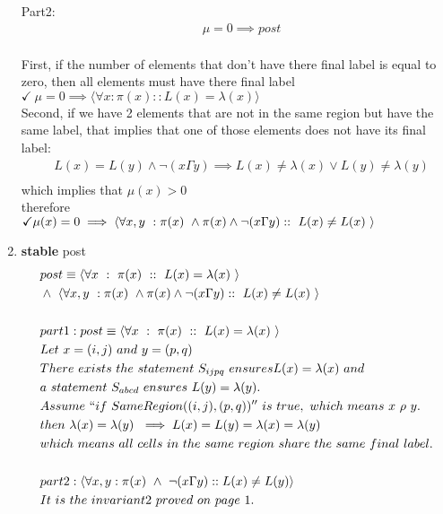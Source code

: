 \documentclass{article}
\begin{document}
\begin{enumerate}
Part2:\\
\begin{align*}
&\mu = 0 \implies post\\
\end{align*}

First, if the number of elements that don't have there final label is equal to zero, then all elements must have there final label\\
$\checkmark \ \mu = 0 \implies \langle \forall x : \pi(x) :: L(x)=\lambda(x) \rangle$\\

Second, if we have 2 elements that are not in the same region but have the same label, that implies that one of those elements does not have its final label:\\
\begin{align*}
&L(x) = L(y) \wedge \neg(x \Gamma y) \implies L(x)\neq\lambda(x) \vee L(y)\neq \lambda(y)\\
\end{align*}
which implies that
$\mu(x) > 0$\\
therefore\\
$\checkmark \mu(x)=0 \implies  \langle \forall x,y \ : \pi(x) \ \wedge \pi(x) \wedge \neg(x \Gamma y) :: \ L(x) \neq L(x)  \ \rangle\\$


\newpage
\item
\textbf{stable} post\\
\begin{align*}
&post \equiv \langle \forall x \ : \ \pi(x) \ :: \ L(x) = \lambda(x) \ \rangle\\
&\wedge \ \langle \forall x,y \ : \pi(x) \ \wedge \pi(x) \wedge \neg(x \Gamma y) :: \ L(x) \neq L(x)  \ \rangle\\
\\
&part 1:
post \equiv \langle \forall x \ : \ \pi(x) \ :: \ L(x) = \lambda(x) \ \rangle\\
&Let\ x = (i,j) \ and \ y = (p,q)\\
&There \ exists \ the \ statement\ S_{ijpq} \ ensures L(x)=\lambda(x) \ and\\ 
&a\ statement \ S_{abcd}\ ensures \ L(y)=\lambda(y).\\
&Assume\ ``if\ SameRegion((i,j),(p,q))'' \ is\ true,\ which\ means\ x\ \rho\ y.\\ 
&then \ \lambda(x)=\lambda(y)\ \implies L(x)=L(y)=\lambda(x)=\lambda(y)\\
&which\ means\ all\ cells\ in \ the\ same\ region\ share\ the\ same\ final\ label.\\
\\
&part 2:
\langle \forall x,y : \pi(x) \ \wedge \ \neg(x\Gamma y) :: L(x)\neq L(y) \rangle\\
&It\ is\ the\ invariant2\ proved\ on\ page\ 1.
\end{align*}
\end{enumerate}
\end{document}
